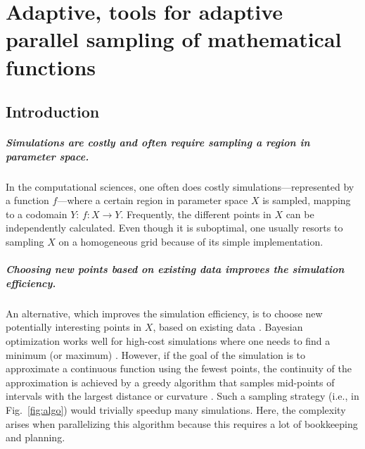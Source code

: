\chapter{Adaptive, tools for adaptive parallel sampling of mathematical functions}
\label{ch:adaptive}

\newpage
\noindent
\hypertarget{introduction}{%
\section{Introduction}\label{introduction}}

\hypertarget{simulations-are-costly-and-often-require-sampling-a-region-in-parameter-space.}{%
\paragraph{Simulations are costly and often require sampling a region in parameter space.}\label{simulations-are-costly-and-often-require-sampling-a-region-in-parameter-space.}}

In the computational sciences, one often does costly simulations---represented by a function $f$---where a certain region in parameter space $X$ is sampled, mapping to a codomain $Y$: $f \colon X \to Y$.
Frequently, the different points in $X$ can be independently calculated.
Even though it is suboptimal, one usually resorts to sampling $X$ on a homogeneous grid because of its simple implementation.

\hypertarget{choosing-new-points-based-on-existing-data-improves-the-simulation-efficiency.}{%
\paragraph{Choosing new points based on existing data improves the simulation efficiency.}\label{choosing-new-points-based-on-existing-data-improves-the-simulation-efficiency.}}

An alternative, which improves the simulation efficiency, is to choose new potentially interesting points in $X$, based on existing data \cite{Gramacy2004, Figueiredo1995, Castro2008, Chen2017}.
Bayesian optimization works well for high-cost simulations where one needs to find a minimum (or maximum) \cite{Takhtaganov2018}.
However, if the goal of the simulation is to approximate a continuous function using the fewest points, the continuity of the approximation is achieved by a greedy algorithm that samples mid-points of intervals with the largest distance or curvature \cite{Wolfram2011}.
Such a sampling strategy (i.e., in Fig.~\ref{fig:algo}) would trivially speedup many simulations.
Here, the complexity arises when parallelizing this algorithm because this requires a lot of bookkeeping and planning.

